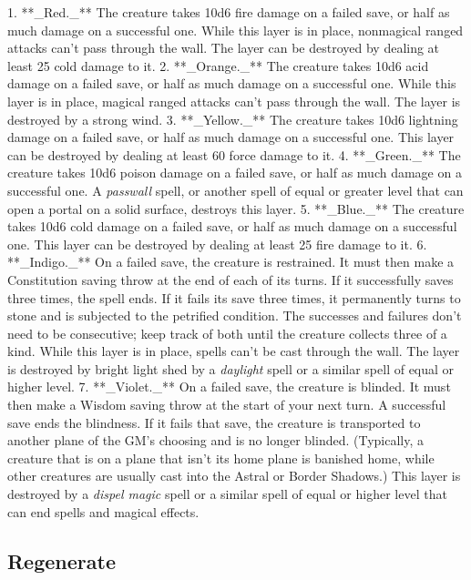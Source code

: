 1.  **_Red._** The creature takes 10d6 fire damage on a failed save, or half as much damage on a successful one. While this layer is in place, nonmagical ranged attacks can’t pass through the wall. The layer can be destroyed by dealing at least 25 cold damage to it.
2.  **_Orange._** The creature takes 10d6 acid damage on a failed save, or half as much damage on a successful one. While this layer is in place, magical ranged attacks can’t pass through the wall. The layer is destroyed by a strong wind.
3.  **_Yellow._** The creature takes 10d6 lightning damage on a failed save, or half as much damage on a successful one. This layer can be destroyed by dealing at least 60 force damage to it.
4.  **_Green._** The creature takes 10d6 poison damage on a failed save, or half as much damage on a successful one. A \textit{passwall} spell, or another spell of equal or greater level that can open a portal on a solid surface, destroys this layer.
5.  **_Blue._** The creature takes 10d6 cold damage on a failed save, or half as much damage on a successful one. This layer can be destroyed by dealing at least 25 fire damage to it.
6.  **_Indigo._** On a failed save, the creature is restrained. It must then make a Constitution saving throw at the end of each of its turns. If it successfully saves three times, the spell ends. If it fails its save three times, it permanently turns to stone and is subjected to the petrified condition. The successes and failures don’t need to be consecutive; keep track of both until the creature collects three of a kind. While this layer is in place, spells can’t be cast through the wall. The layer is destroyed by bright light shed by a \textit{daylight} spell or a similar spell of equal or higher level.
7.  **_Violet._** On a failed save, the creature is blinded. It must then make a Wisdom saving throw at the start of your next turn. A successful save ends the blindness. If it fails that save, the creature is transported to another plane of the GM’s choosing and is no longer blinded. (Typically, a creature that is on a plane that isn’t its home plane is banished home, while other creatures are usually cast into the Astral or  Border Shadows.) This layer is destroyed by a \textit{dispel magic} spell or a similar spell of equal or higher level that can end spells and magical effects.

\subsection{Regenerate}


